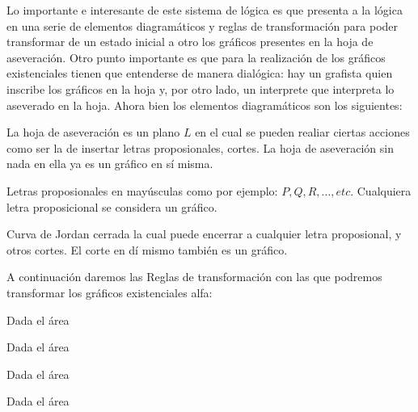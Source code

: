 \documentclass[
	fontsize=10pt, %
	twoside=false, %
	secnumdepth=1, %
	abstract=true, %
]{kaohandt}
\begin{document}
Lo importante e interesante de este sistema de lógica es que presenta a la lógica en una serie de elementos diagramáticos y reglas de transformación para poder transformar de un estado inicial a otro los gráficos presentes en la hoja de aseveración. Otro punto importante es que para la realización de los gráficos existenciales tienen que entenderse de manera dialógica: hay un grafista quien inscribe los gráficos en la hoja y, por otro lado, un interprete que interpreta lo aseverado en la hoja. Ahora bien los elementos diagramáticos son los siguientes:

\begin{definition}
	La hoja de aseveración es un plano $ L $ en el cual se pueden realiar ciertas acciones como ser la de insertar letras proposionales, cortes. La hoja de aseveración sin nada en ella ya es un gráfico en sí misma.
\end{definition}

\begin{definition}
	Letras proposionales en mayúsculas como por ejemplo: $ P, Q, R, \dots, etc $. Cualquiera letra proposicional se considera un gráfico.
\end{definition}

\begin{definition}[Corte]
	Curva de Jordan cerrada la cual puede encerrar a cualquier letra proposional, y otros cortes. El corte en dí mismo también es un gráfico.
\end{definition}

A continuación daremos las Reglas de transformación con las que podremos transformar los gráficos existenciales alfa:

\begin{definition}
	Dada el área
\end{definition}

\begin{definition}
	Dada el área
\end{definition}

\begin{definition}
	Dada el área
\end{definition}

\begin{definition}
	Dada el área
\end{definition}
\end{document}
